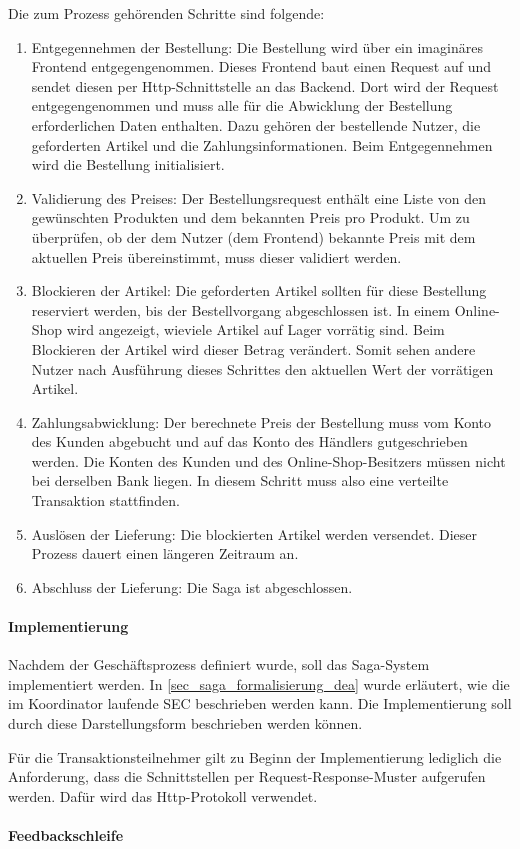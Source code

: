 Die zum Prozess gehörenden Schritte sind folgende:
\begin{enumerate}
	\item Entgegennehmen der Bestellung: Die Bestellung wird über ein imaginäres Frontend entgegengenommen. Dieses Frontend baut einen Request auf und sendet diesen per Http-Schnittstelle an das Backend. Dort wird der Request entgegengenommen und muss alle für die Abwicklung der Bestellung erforderlichen Daten enthalten. Dazu gehören der bestellende Nutzer, die geforderten Artikel und die Zahlungsinformationen. Beim Entgegennehmen wird die Bestellung initialisiert.
	\item Validierung des Preises: Der Bestellungsrequest enthält eine Liste von den gewünschten Produkten und dem bekannten Preis pro Produkt. Um zu überprüfen, ob der dem Nutzer (dem Frontend) bekannte Preis mit dem aktuellen Preis übereinstimmt, muss dieser validiert werden. %
	\item Blockieren der Artikel: Die geforderten Artikel sollten für diese Bestellung reserviert werden, bis der Bestellvorgang abgeschlossen ist. In einem Online-Shop wird angezeigt, wieviele Artikel auf Lager vorrätig sind. Beim Blockieren der Artikel wird dieser Betrag verändert. Somit sehen andere Nutzer nach Ausführung dieses Schrittes den aktuellen Wert der vorrätigen Artikel. 
	\item Zahlungsabwicklung: Der berechnete Preis der Bestellung muss vom Konto des Kunden abgebucht und auf das Konto des Händlers gutgeschrieben werden. Die Konten des Kunden und des Online-Shop-Besitzers müssen nicht bei derselben Bank liegen. In diesem Schritt muss also eine verteilte Transaktion stattfinden.
	\item Auslösen der Lieferung: Die blockierten Artikel werden versendet. Dieser Prozess dauert einen längeren Zeitraum an.
	\item Abschluss der Lieferung: Die Saga ist abgeschlossen.
\end{enumerate}

\paragraph*{Implementierung}

Nachdem der Geschäftsprozess definiert wurde, soll das Saga-System implementiert werden. In \ref{sec_saga_formalisierung_dea} wurde erläutert, wie die im Koordinator laufende SEC beschrieben werden kann. Die Implementierung soll durch diese Darstellungsform beschrieben werden können.

Für die Transaktionsteilnehmer gilt zu Beginn der Implementierung lediglich die Anforderung, dass die Schnittstellen per Request-Response-Muster aufgerufen werden. Dafür wird das Http-Protokoll verwendet.


\paragraph*{Feedbackschleife}
